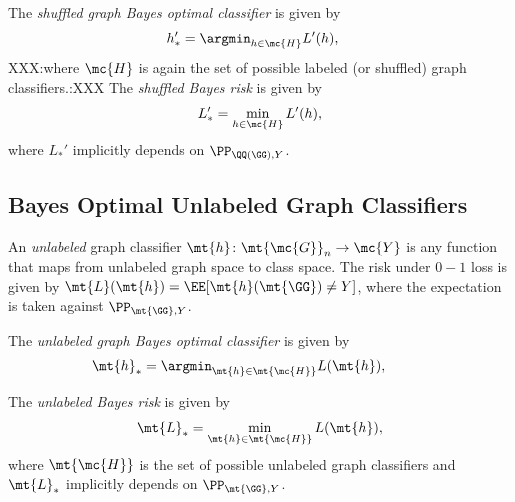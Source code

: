 \documentclass[10pt,journal,cspaper,compsoc]{IEEEtran}
\begin{document}
The \emph{shuffled graph Bayes optimal classifier} is given by
\begin{align}
	h_*' &= \argmin_{h \in \mc{H}} L'(h), %
\end{align}
XXX:where $\mc{H}$ is again the set of possible labeled (or shuffled) graph classifiers.:XXX The \emph{shuffled Bayes risk} is given by
\begin{align}
	L_*' =\min_{h \in \mc{H}} L'(h),
\end{align}
where  $L_*'$ implicitly depends on $\PP_{\QQ(\GG),Y}$.  %

\subsection{Bayes Optimal Unlabeled Graph Classifiers} %


An \emph{unlabeled} graph classifier $\mt{h}\colon \mt{\mc{G}}_n \to \mc{Y}$ is any function that maps from unlabeled graph space to class space. The risk under $0-1$ loss is given by $\mt{L}(\mt{h})=\EE[\mt{h}(\mt{\GG})\neq Y]$, where the expectation is taken against $\PP_{\mt{\GG},Y}$. 

The \emph{unlabeled graph Bayes optimal classifier} is given by %
\begin{align}
	\mt{h}_* &= \argmin_{\mt{h} \in \mt{\mc{H}}} L(\mt{h}), \qquad %
\end{align}



The \emph{unlabeled Bayes risk} is given by %
\begin{align}
	\mt{L}_* =\min_{\mt{h} \in \mt{\mc{H}}} L(\mt{h}),
\end{align}
where $\mt{\mc{H}}$ is the set of possible unlabeled graph classifiers
and $\mt{L}_*$ implicitly depends on $\PP_{\mt{\GG},Y}$.  

\end{document}
